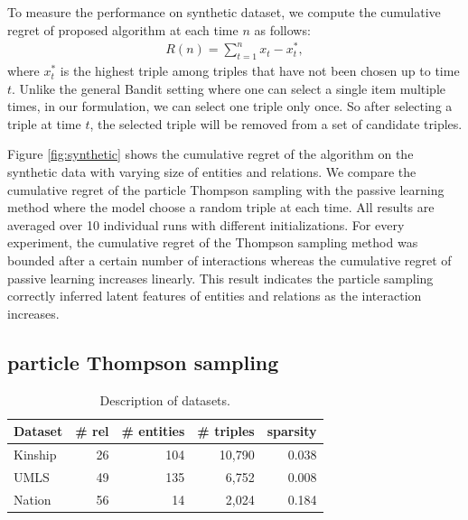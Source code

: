 To measure the performance on synthetic dataset, we compute the cumulative regret of proposed algorithm at each time $n$ as follows:
\begin{align}
R(n) = \sum_{t=1}^{n} x_t - x^{*}_t,
\end{align}
where $x^*_t$ is the highest triple among triples that have not been chosen up to time $t$. Unlike the general Bandit setting where one can select a single item multiple times, in our formulation, we can select one triple only once. So after selecting a triple at time $t$, the selected triple will be removed from a set of candidate triples.

Figure \ref{fig:synthetic} shows the cumulative regret of the algorithm on the synthetic data with varying size of entities and relations. We compare the cumulative regret of the particle Thompson sampling with the passive learning method where the model choose a random triple at each time. All results are averaged over 10 individual runs with different initializations. For every experiment, the cumulative regret of the Thompson sampling method was bounded after a certain number of interactions whereas the cumulative regret of passive learning increases linearly. This result indicates the particle sampling correctly inferred latent features of entities and relations as the interaction increases.

\subsection{particle Thompson sampling}
\begin{table}[t]
\centering
\caption{\label{tbl:dataset}Description of datasets.}
\begin{tabular}{l | r | r | r | r}
Dataset &  \# rel & \# entities & \# triples & sparsity \\ \hline
Kinship & 26 & 104  & 10,790 & 0.038 \\
UMLS & 49 &135  & 6,752 & 0.008 \\
Nation & 56 & 14  & 2,024 & 0.184 \\
\end{tabular}
\end{table}

